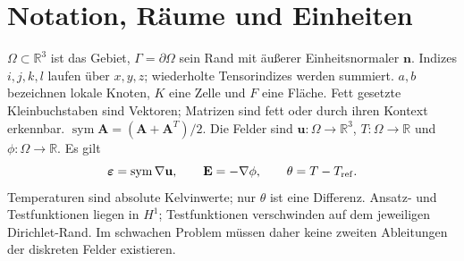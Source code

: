 \section{Notation, Räume und Einheiten}
$\Omega\subset\mathbb R^3$ ist das Gebiet, $\Gamma=\partial\Omega$ sein Rand
mit äußerer Einheitsnormaler $\mathbf n$. Indizes $i,j,k,l$ laufen über
$x,y,z$; wiederholte Tensorindizes werden summiert. $a,b$ bezeichnen lokale
Knoten, $K$ eine Zelle und $F$ eine Fläche. Fett gesetzte Kleinbuchstaben sind
Vektoren; Matrizen sind fett oder durch ihren Kontext erkennbar.
$\operatorname{sym}\mathbf A=(\mathbf A+\mathbf A^T)/2$.
Die Felder sind $\mathbf u:\Omega\to\mathbb R^3$, $T:\Omega\to\mathbb R$
und $\phi:\Omega\to\mathbb R$. Es gilt
\begin{equation}\label{eq:kinematics}
\boldsymbol\varepsilon=\operatorname{sym}\nabla\mathbf u,
\qquad\mathbf E=-\nabla\phi,\qquad\theta=T-T_{\rm ref}.
\end{equation}
Temperaturen sind absolute Kelvinwerte; nur $\theta$ ist eine Differenz.
Ansatz- und Testfunktionen liegen in $H^1$; Testfunktionen verschwinden auf dem
jeweiligen Dirichlet-Rand. Im schwachen Problem müssen daher keine zweiten
Ableitungen der diskreten Felder existieren.

